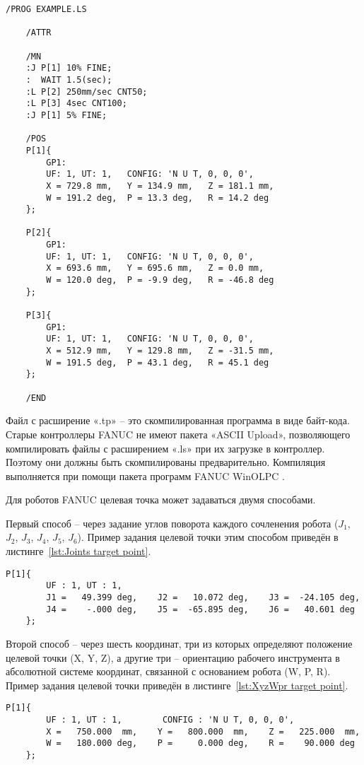 \begin{lstlisting}[caption={Пример оформления .LS файлов}, label={lst:LS example}]
	/PROG EXAMPLE.LS

	/ATTR

	/MN
	:J P[1] 10% FINE;
	:  WAIT 1.5(sec);
	:L P[2] 250mm/sec CNT50;
	:L P[3] 4sec CNT100;
	:J P[1] 5% FINE;

	/POS
	P[1]{
		GP1:
		UF: 1, UT: 1,	CONFIG: 'N U T, 0, 0, 0',
		X = 729.8 mm,	Y = 134.9 mm,	Z = 181.1 mm,
		W = 191.2 deg,	P = 13.3 deg,	R = 14.2 deg
	};

	P[2]{
		GP1:
		UF: 1, UT: 1,	CONFIG: 'N U T, 0, 0, 0',
		X = 693.6 mm,	Y = 695.6 mm,	Z = 0.0 mm,
		W = 120.0 deg,	P = -9.9 deg,	R = -46.8 deg
	};

	P[3]{
		GP1:
		UF: 1, UT: 1,	CONFIG: 'N U T, 0, 0, 0',
		X = 512.9 mm,	Y = 129.8 mm,	Z = -31.5 mm,
		W = 191.5 deg,	P = 43.1 deg,	R = 45.1 deg
	};

	/END
\end{lstlisting}

Файл с расширение «.tp» -- это скомпилированная программа в виде байт-кода.
Старые контроллеры FANUC не имеют пакета «ASCII Upload», позволяющего компилировать файлы с расширением «.ls» при их загрузке в контроллер.
Поэтому они должны быть скомпилированы предварительно.
Компиляция выполняется при помощи пакета программ FANUC WinOLPC .

Для роботов FANUC целевая точка может задаваться двумя способами.

Первый способ -- через задание углов поворота каждого сочленения робота ($J_1$, $J_2$, $J_3$, $J_4$, $J_5$, $J_6$).
Пример задания целевой точки этим способом приведён в листинге~\ref{lst:Joints target point}.

\begin{lstlisting}[caption={Целевая точка через углы J1 -- J6}, label={lst:Joints target point}]
	P[1]{
		UF : 1, UT : 1,
		J1 =   49.399 deg,    J2 =   10.072 deg,    J3 =  -24.105 deg,
		J4 =    -.000 deg,    J5 =  -65.895 deg,    J6 =   40.601 deg
	};
\end{lstlisting}

Второй способ -- через шесть координат, три из которых определяют положение целевой точки (X, Y, Z), а другие три -- ориентацию рабочего инструмента в абсолютной системе координат, связанной с основанием робота (W, P, R).
Пример задания целевой точки приведён в листинге~\ref{lst:XyzWpr target point}.

\begin{lstlisting}[caption={Целевая точка через координаты XYZWPR}, label={lst:XyzWpr target point}]
	P[1]{
		UF : 1, UT : 1,        CONFIG : 'N U T, 0, 0, 0',
		X =   750.000  mm,    Y =   800.000  mm,    Z =   225.000  mm,
		W =   180.000 deg,    P =     0.000 deg,    R =    90.000 deg
	};
\end{lstlisting}

